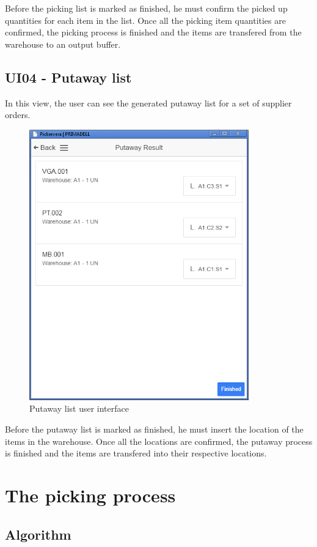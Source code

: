 \documentclass[a4paper]{article}
\begin{document}
Before the picking list is marked as finished, he must confirm the picked up quantities for each item in the list. Once all the picking item quantities are confirmed, the picking process is finished and the items are transfered from the warehouse to an output buffer.
\newpage

\subsection{UI04 - Putaway list}
\label{sec: putaway}

In this view, the user can see the generated putaway list for a set of supplier orders. 

\begin{figure}[h!]
\centerline{\includegraphics[width=9.5cm]{putawayList.png}}
\caption{Putaway list user interface}
\end{figure}

Before the putaway list is marked as finished, he must insert the location of the items in the warehouse. Once all the locations are confirmed, the putaway process is finished and the items are transfered into their respective locations.

\newpage

\section{The picking process}
\subsection{Algorithm}
\end{document}
